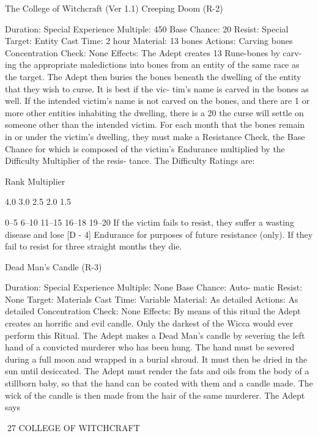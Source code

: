\begin{Chapter}{The College of Witchcraft (Ver 1.1)}
Creeping Doom (R-2) 

Duration: Special 
Experience Multiple: 450 
Base Chance: 20%
Resist: Special 
Target: Entity 
Cast Time: 2 hour 
Material: 13 bones 
Actions: Carving bones 
Concentration Check: None 
Effects: The Adept creates 13 Rune-bones by carv-
ing  the  appropriate  maledictions  into  bones  from 
an entity of the same race as the target. The Adept 
then  buries  the  bones  beneath  the  dwelling  of  the 
entity  that  they  wish  to  curse.  It  is  best  if  the  vic-
tim’s  name  is  carved  in  the  bones  as  well.  If  the 
intended victim’s name is not carved on the bones, 
and there are 1 or more other entities inhabiting the 
dwelling, there is a 20%
the  curse  will  settle  on  someone  other  than  the 
intended  victim.  For  each  month  that  the  bones 
remain in or under the victim’s dwelling, they must 
make  a  Resistance  Check,  the  Base  Chance  for 
which  is  composed  of  the  victim’s  Endurance 
multiplied by the Difficulty Multiplier of the resis-
tance. The Difficulty Ratings are: 

Rank  Multiplier 

4.0 
3.0 
2.5 
2.0 
1.5 

0–5 
6–10 
11–15 
16–18 
19–20 
If  the  victim  fails  to  resist,  they  suffer  a  wasting 
disease and lose [D - 4] Endurance for purposes of 
future  resistance  (only).  If  they  fail  to  resist  for 
three straight months they die. 

Dead Man’s Candle (R-3) 

Duration: Special 
Experience  Multiple:  None  Base  Chance:  Auto-
matic 
Resist: None 
Target: Materials 
Cast Time: Variable 
Material: As detailed 
Actions: As detailed 
Concentration Check: None 
Effects:  By  means  of  this  ritual  the  Adept  creates 
an horrific and evil candle. Only the darkest of the 
Wicca  would  ever  perform  this  Ritual.  The  Adept 
makes  a  Dead  Man’s  candle  by  severing  the  left 
hand  of  a  convicted  murderer  who  has been  hung. 
The  hand must be  severed  during a  full  moon  and 
wrapped in a burial shroud. It must then be dried in 
the sun until desiccated. The Adept must render the 
fats  and  oils  from the  body  of  a  stillborn  baby,  so 
that the hand can be coated with them and a candle 
made.  The  wick  of  the  candle  is  then  made  from 
the  hair  of  the  same  murderer.  The  Adept  says 

27 COLLEGE OF WITCHCRAFT 


\end{Chapter}
